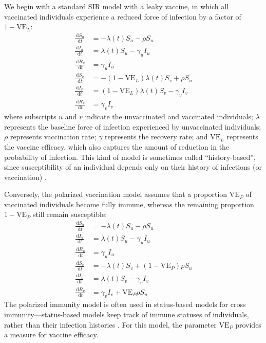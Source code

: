 \documentclass[12pt]{article}
\newcommand{\dd}[1]{\ensuremath{\, \mathrm{d}#1}}
\newcommand{\VE}{\ensuremath{\textrm{VE}}}
\begin{document}
We begin with a standard SIR model with a leaky vaccine, in which all vaccinated individuals experience a reduced force of infection by a factor of $1-\VE_L$:
\begin{align}
\frac{\dd S_u}{\dd t} &= - \lambda(t) S_u - \rho S_u \\
\frac{\dd I_u}{\dd t} &= \lambda(t) S_u - \gamma_u I_u \\
\frac{\dd R_u}{\dd t} &= \gamma_u I_u \\
\frac{\dd S_v}{\dd t} &= - (1-\VE_L) \lambda(t) S_v + \rho S_u \\
\frac{\dd I_v}{\dd t} &= (1-\VE_L) \lambda(t) S_v - \gamma_v I_v \\
\frac{\dd R_v}{\dd t} &= \gamma_v I_v
\end{align}
where subscripts $u$ and $v$ indicate the unvaccinated and vaccinated individuals;
$\lambda$ represents the baseline force of infection experienced by unvaccinated individuals; 
$\rho$ represents vaccination rate;
$\gamma$ represents the recovery rate;
and $\VE_L$ represents the vaccine efficacy, which also captures the amount of reduction in the probability of infection.
This kind of model is sometimes called “history-based”, since susceptibility of an individual depends only on their history of infections (or vaccination) \citep{gog2002dynamics,gog2002status,kucharski2016capturing}.

Conversely, the polarized vaccination model assumes that a proportion $\VE_P$ of vaccinated individuals become fully immune, whereas the remaining proportion $1-\VE_P$ still remain susceptible: 
\begin{align}
\frac{\dd S_u}{\dd t} &= - \lambda(t) S_u - \rho S_u \\
\frac{\dd I_u}{\dd t} &= \lambda(t) S_u - \gamma_u I_u \\
\frac{\dd R_u}{\dd t} &= \gamma_u I_u \\
\frac{\dd S_v}{\dd t} &= - \lambda(t) S_v + (1-\VE_P) \rho S_u \\
\frac{\dd I_v}{\dd t} &= \lambda(t) S_v - \gamma_v I_v \\
\frac{\dd R_v}{\dd t} &= \gamma_v I_v + \VE_P \rho S_u
\end{align}
The polarized immunity model is often used in status-based models for cross immunity---status-based models keep track of immune statuses of individuals, rather than their infection histories \citep{gog2002dynamics,gog2002status,kucharski2016capturing}.
For this model, the parameter $\VE_P$ provides a measure for vaccine efficacy.
\end{document}
